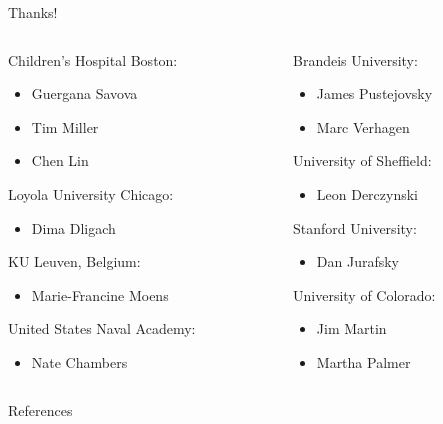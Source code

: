 \documentclass[12pt,compress]{beamer}
\begin{document}
\begin{frame}{Thanks!}
\begin{columns}[t]
  \begin{column}{0.5\textwidth}
    Children's Hospital Boston:
    \begin{itemize}
      \item Guergana Savova
      \item Tim Miller
      \item Chen Lin
    \end{itemize}
    Loyola University Chicago:
    \begin{itemize}
      \item Dima Dligach
    \end{itemize}
    KU Leuven, Belgium:
    \begin{itemize}
      \item Marie-Francine Moens
    \end{itemize}
    United States Naval Academy:
    \begin{itemize}
      \item Nate Chambers
    \end{itemize}
  \end{column}
  \begin{column}{0.5\textwidth}
    Brandeis University:
    \begin{itemize}
      \item James Pustejovsky
      \item Marc Verhagen
    \end{itemize}
    University of Sheffield:
    \begin{itemize}
      \item Leon Derczynski
    \end{itemize}
    Stanford University:
    \begin{itemize}
      \item Dan Jurafsky
    \end{itemize}
    University of Colorado:
    \begin{itemize}
      \item Jim Martin
      \item Martha Palmer
    \end{itemize}
  \end{column}
\end{columns}
\end{frame}


\renewcommand{\appendixname}{Supplementary Material}
\appendix


\begin{frame}[allowframebreaks]{References}
\printbibliography
\end{frame}
\end{document}
